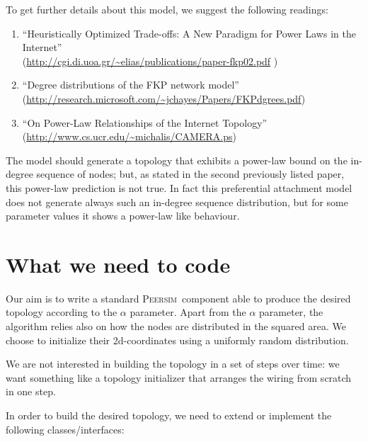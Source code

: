 \documentclass[a4paper,12pt]{article}
\newcommand{\id}[1]{{\scshape\small #1}}
\newcommand{\psim}{\id{Peersim}}
\begin{document}
To get further details about this model, we suggest the following
readings:

\begin{enumerate}

\item ``Heuristically Optimized Trade-offs: A New Paradigm for Power
Laws in the Internet'' \\
(\url{http://cgi.di.uoa.gr/~elias/publications/paper-fkp02.pdf} )

\item  ``Degree distributions
of the FKP network model'' \\
(\url{http://research.microsoft.com/~jchayes/Papers/FKPdgrees.pdf}) 

\item ``On Power-Law
Relationships of the Internet Topology''\\
(\url{http://www.cs.ucr.edu/~michalis/CAMERA.ps})

\end{enumerate}

The model should generate a topology that exhibits a power-law bound
on the in-degree sequence of nodes; but, as stated in the second
previously listed paper, this power-law prediction is not true. In fact
this preferential attachment model does not generate always such an
in-degree sequence 
distribution, but for some parameter values it shows a power-law like
behaviour. 

\section{What we need to code}
\label{s:coding}

Our aim is to write a standard \psim~component able to produce the
desired topology according to the $\alpha$ parameter. Apart from the
$\alpha$ parameter, the algorithm relies also on how the nodes are
distributed in the squared area. We choose to initialize their
2d-coordinates using a uniformly random distribution.

We are not interested
in building the topology in a set of steps over time: we want
something like a topology initializer that arranges the wiring from scratch in
one step.

In order to build the desired topology, we need to extend or implement
the following classes/interfaces:  
\end{document}
